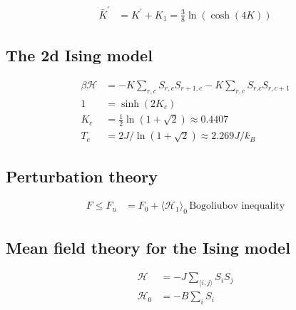 \begin{equation*}
    \begin{aligned}
        \bar{K}^{'} &= K^{'} + K_1 = \frac{3}{8} \ln(\cosh(4K))
    \end{aligned}
\end{equation*}

\subsection*{ The 2d Ising model}
\begin{equation*}
    \begin{aligned}
        \beta \mathcal{H} &= -K\sum_{r,c} S_{r,c} S_{r+1,c} - K \sum_{r,c} S_{r.c} S_{r,c+1} \\
        1 &= \sinh(2K_c) \\
        K_c &= \frac{1}{2} \ln \left(1+ \sqrt{2}\right) \approx 0.4407 \\
        T_c &= 2J / \ln \left(1 + \sqrt{2}\right) \approx 2.269 J/k_B
    \end{aligned}
\end{equation*}

\subsection*{Perturbation theory}
\begin{equation*}
    \begin{aligned}
        F \leq F_u &= F_0 + \langle \mathcal{H}_1 \rangle_0 \, \text{Bogoliubov inequality}
    \end{aligned}
\end{equation*}

\subsection*{Mean field theory for the Ising model}
\begin{equation*}
    \begin{aligned}
        \mathcal{H} &= -J \sum_{\langle i,j \rangle} S_i S_j \\
        \mathcal{H}_0 &= -B \sum_i S_i
    \end{aligned}
\end{equation*}